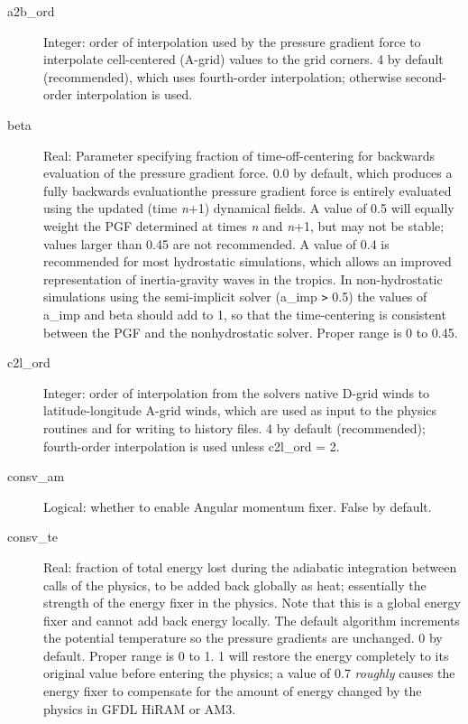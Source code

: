 \documentclass[12pt,letterpaper]{book}
\begin{document}
\begin{description}

\item[a2b\_ord] Integer: order of interpolation used by the pressure gradient force to interpolate cell-centered 
(A-grid) values to the grid corners. 4 by default (recommended), which uses fourth-order interpolation; otherwise second-order interpolation is used. 


\item[beta] Real: Parameter specifying fraction of time-off-centering for backwards evaluation of the pressure gradient force. 
0.0 by default, which produces a fully backwards evaluationthe pressure gradient force is entirely evaluated using the updated 
(time \textit{n}+1) dynamical fields. A value of 0.5 will equally weight the PGF determined at times \textit{n} and \textit{n}+1, but may not be stable; values larger than 
0.45 are not recommended. A value of 0.4 is recommended for most hydrostatic simulations, which allows an improved representation of inertia-gravity waves in the tropics. In non-hydrostatic simulations using the semi-implicit solver 
(a\_imp \texttt{>} 0.5) the values of a\_imp and beta should add to 1, so that the time-centering is consistent between the PGF and the nonhydrostatic solver. Proper range is 
0 to 0.45.


\item[c2l\_ord] Integer: order of interpolation from the solvers native D-grid winds to latitude-longitude A-grid winds, which are used as input to the physics routines and for writing to history files. 
4 by default (recommended); fourth-order interpolation is used unless c2l\_ord 
= 2. 


\item[consv\_am] Logical: whether to enable Angular momentum fixer. False by default.


\item[consv\_te] Real: fraction of total energy lost during the adiabatic integration between calls of the physics, to be added back globally as heat; essentially the strength of the 
energy fixer in the physics. Note that this is a global energy fixer and cannot add back energy locally. The default algorithm increments the potential temperature so the pressure gradients are unchanged. 0 by default. Proper range is 0 to 1. 
1 will restore the energy completely to its original value before entering the physics; a value of 
0.7 \textit{roughly} causes the energy fixer to compensate for the amount of energy changed by the physics in GFDL HiRAM or AM3. 


\end{description}
\end{document}
